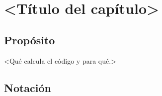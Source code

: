 %
%
\chapter{<Título del capítulo>}\label{cap:<etiqueta>}

\section{Propósito}\label{sec:capNN-proposito}

<Qué calcula el código y para qué.>

\section{Notación}\label{sec:capNN-notacion}


